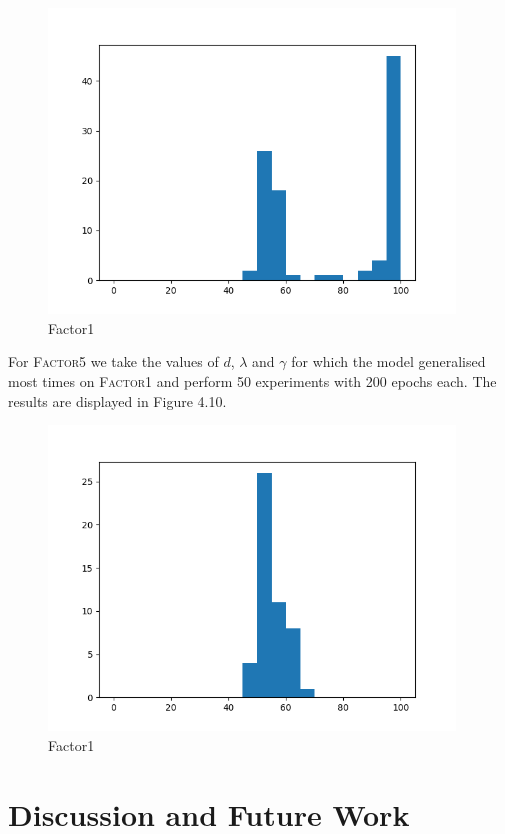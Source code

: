 \documentclass[titlepage]{report}
\begin{document}
\begin{figure}[H]
\centering
\includegraphics[width = 108mm]{figures/histograms/factor1/gates/5-01-01}
\caption{Factor1}
\end{figure}

\noindent
For \textsc{Factor5} we take the values of $d$, $\lambda$ and $\gamma$ for which the model generalised most times on \textsc{Factor1} and perform 50 experiments with 200 epochs each. The results are displayed in Figure 4.10.

\begin{figure}[H]
\centering
\includegraphics[width = 108mm]{figures/histograms/factor5/gates/5-01-01}
\caption{Factor1}
\end{figure}

\chapter{Discussion and Future Work}

\normalem
\printbibliography
\end{document}
